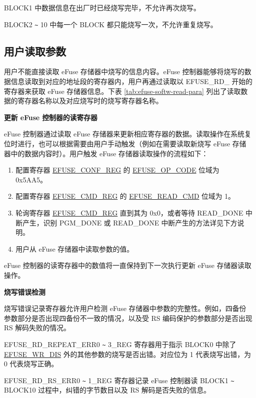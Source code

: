 \documentclass[main\_\_CN.tex]{subfiles}
\begin{document}
BLOCK1 中数据信息在出厂时已经烧写完毕，不允许再次烧写。

BLOCK2 \verb+~+ 10 中每一个 BLOCK 都只能烧写一次，不允许重复烧写。

\subsection{用户读取参数}
\label{sec:efuse-software-read-para}

用户不能直接读取 eFuse 存储器中烧写的信息内容。eFuse 控制器能够将烧写的数据信息读取到对应的地址段的寄存器内，用户再通过读取以 EFUSE\_RD\_ 开始的寄存器来获取 eFuse 存储器信息。下表 \ref{tab:efuse-softw-read-para} 列出了读取数据的寄存器名称以及对应烧写时的烧写寄存器名称。



{\bfseries 更新 eFuse 控制器的读寄存器}
\label{sec:efuse-update-reg}

eFuse 控制器通过读取 eFuse 存储器来更新相应寄存器的数据。读取操作在系统复位时进行，也可以根据需要由用户手动触发（例如在需要读取新烧写 eFuse 存储器中的数据内容时）。用户触发 eFuse 存储器读取操作的流程如下：
\begin{enumerate}
    \item 配置寄存器 \hyperref[regdesc:EFUSECONFREG]{EFUSE\_CONF\_REG} 的 \hyperref[fielddesc:EFUSEOPCODE]{EFUSE\_OP\_CODE} 位域为 0x5AA5。
    \item 配置寄存器 \hyperref[regdesc:EFUSECMDREG]{EFUSE\_CMD\_REG} 的 \hyperref[fielddesc:EFUSEREADCMD]{EFUSE\_READ\_CMD} 位域为 1。
    \item 轮询寄存器 \hyperref[regdesc:EFUSECMDREG]{EFUSE\_CMD\_REG} 直到其为 0x0，或者等待 READ\_DONE 中断产生，识别 PGM\_DONE 或 READ\_DONE 中断产生的方法详见下方说明。
    \item 用户从 eFuse 存储器中读取参数的值。
\end{enumerate}
eFuse 控制器的读寄存器中的数值将一直保持到下一次执行更新 eFuse 存储器读取操作。

{\bfseries 烧写错误检测}

烧写错误记录寄存器允许用户检测 eFuse 存储器中参数的完整性。例如，四备份参数部分是否出现四备份不一致的情况，以及受  RS 编码保护的参数部分是否出现 RS 解码失败的情况。

EFUSE\_RD\_REPEAT\_ERR0 \verb+~+ 3\_REG 寄存器用于指示 BLOCK0 中除了 \hyperref[fielddesc:EFUSEWRDIS]{EFUSE\_WR\_DIS} 外的其他参数的烧写是否出错。对应位为 1 代表烧写出错，为 0 代表烧写正确。

EFUSE\_RD\_RS\_ERR0 \verb+~+ 1\_REG 寄存器记录 eFuse 控制器读 BLOCK1 \verb+~+ BLOCK10 过程中，纠错的字节数目以及 RS 解码是否失败的信息。
\end{document}
